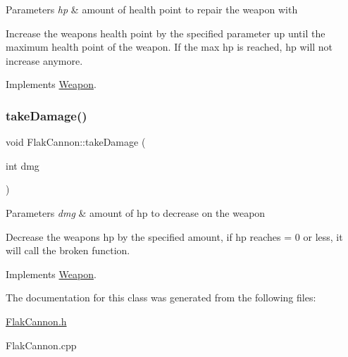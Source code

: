 \begin{DoxyParams}{Parameters}
{\em hp} & amount of health point to repair the weapon with\\
\hline
\end{DoxyParams}
Increase the weapons health point by the specified parameter up until the maximum health point of the weapon. If the max hp is reached, hp will not increase anymore. 

Implements \hyperlink{classWeapon}{Weapon}.

\mbox{\label{classFlakCannon_ae55081dc2801a52421b541e4c42ad415}} 
\subsubsection{\texorpdfstring{take\+Damage()}{takeDamage()}}
{\footnotesize\ttfamily void Flak\+Cannon\+::take\+Damage (\begin{DoxyParamCaption}\item[{int}]{dmg }\end{DoxyParamCaption})\hspace{0.3cm}{\ttfamily [virtual]}}


\begin{DoxyParams}{Parameters}
{\em dmg} & amount of hp to decrease on the weapon\\
\hline
\end{DoxyParams}
Decrease the weapons hp by the specified amount, if hp reaches = 0 or less, it will call the broken function. 

Implements \hyperlink{classWeapon}{Weapon}.



The documentation for this class was generated from the following files\+:\begin{DoxyCompactItemize}
\item 
\hyperlink{FlakCannon_8h}{Flak\+Cannon.\+h}\item 
Flak\+Cannon.\+cpp\end{DoxyCompactItemize}
